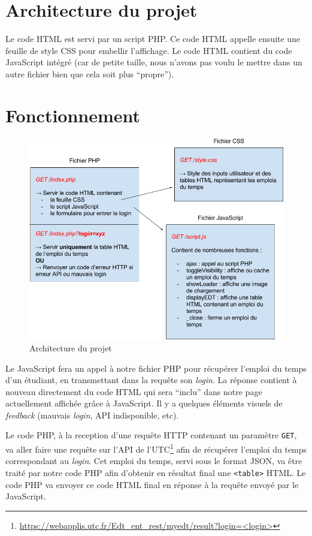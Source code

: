\section{Architecture du projet}

Le code HTML est servi par un script PHP. Ce code HTML appelle ensuite une feuille de style CSS pour embellir l'affichage. Le code HTML contient du code JavaScript intégré (car de petite taille, nous n'avons pas voulu le mettre dans un autre fichier bien que cela soit plus ``propre'').

\section{Fonctionnement}

\begin{figure}[h]
    \centering\includegraphics[width=1.00\textwidth]{images/arch.png}
    \caption{Architecture du projet}
\end{figure}

Le JavaScript fera un appel à notre fichier PHP pour récupérer l'emploi du temps d'un étudiant, en transmettant dans la requête son \textit{login}. La réponse contient à nouveau directement du code HTML qui sera ``inclu'' dans notre page actuellement affichée grâce à JavaScript. Il y a quelques éléments visuels de \textit{feedback} (mauvais \textit{login}, API indisponible, etc).

\medskip

Le code PHP, à la reception d'une requête HTTP contenant un paramètre \lstinline{GET}, va aller faire une requête sur l'API de l'UTC\footnote{\url{https://webapplis.utc.fr/Edt_ent_rest/myedt/result?login=<login>}} afin de récupérer l'emploi du temps correspondant au \textit{login}. Cet emploi du temps, servi sous le format JSON, va être traité par notre code PHP afin d'obtenir en résultat final une \lstinline{<table>} HTML. Le code PHP va envoyer ce code HTML final en réponse à la requête envoyé par le JavaScript.

